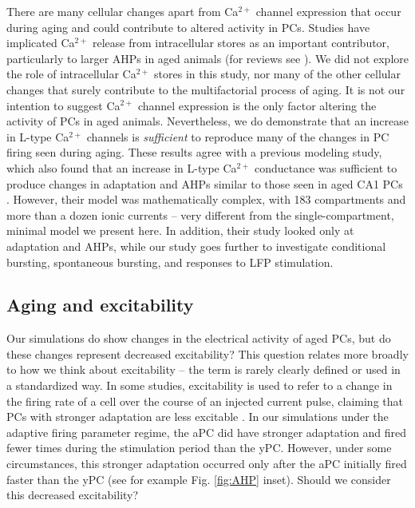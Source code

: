 \documentclass[10pt,letterpaper]{article}
\newcommand{\Ca}{Ca$^{2+}$}
\begin{document}
There are many cellular changes apart from {\Ca} channel expression that occur during aging and could contribute to altered activity in PCs. Studies have implicated {\Ca} release from intracellular stores as an important contributor, particularly to larger AHPs in aged animals
(for reviews see \cite{thibault2007expansion,toescu2010calcium}). We did not explore the role of intracellular {\Ca} stores in this study, nor many of the other cellular changes that surely contribute to the multifactorial process of aging. It is not our intention to suggest {\Ca} channel expression is the only factor altering the activity of PCs in aged animals. Nevertheless, we do demonstrate that an increase in L-type {\Ca} channels is \textit{sufficient} to reproduce many of the changes in PC firing seen during aging. These results agree with a previous modeling study, which also found that an increase in L-type {\Ca} conductance was sufficient to produce changes in adaptation and AHPs similar to those seen in aged CA1 PCs \cite{markaki2005modelling}. However, their model was mathematically complex, with 183 compartments and more than a dozen ionic currents -- very different from the single-compartment, minimal model we present here. In addition, their study looked only at adaptation and AHPs, while our study goes further to investigate conditional bursting, spontaneous bursting, and responses to LFP stimulation.

\subsection*{Aging and excitability}
 Our simulations do show changes in the electrical activity of aged PCs, but do these changes represent decreased excitability? This question relates more broadly to how we think about excitability -- the term is rarely clearly defined or used in a standardized way. In some studies, excitability is used to refer to a change in the firing rate of a cell over the course of an injected current pulse, claiming that PCs with stronger adaptation are less excitable \cite{moyer1992nimodipine}. In our simulations under the adaptive firing parameter regime, the aPC did have stronger adaptation and fired fewer times during the stimulation period than the yPC. However, under some circumstances, this stronger adaptation occurred only after the aPC initially fired faster than the yPC (see for example Fig. \ref{fig:AHP} inset). Should we consider this decreased excitability? 
 
\end{document}
